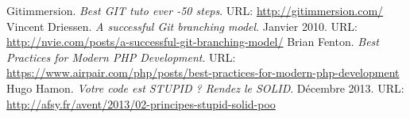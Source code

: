 \begin{thebibliography}{ABC}	
     Gitimmersion. \emph{Best GIT tuto ever -50 steps}. URL: \url{http://gitimmersion.com/}
     Vincent Driessen. \emph{A successful Git branching model}. Janvier 2010. URL: \url{http://nvie.com/posts/a-successful-git-branching-model/}
     Brian Fenton. \emph{Best Practices for Modern PHP Development}. URL: \url{https://www.airpair.com/php/posts/best-practices-for-modern-php-development}
     Hugo Hamon. \emph{Votre code est STUPID ? Rendez le SOLID}. Décembre 2013. URL: \url{http://afsy.fr/avent/2013/02-principes-stupid-solid-poo}
\end{thebibliography}
